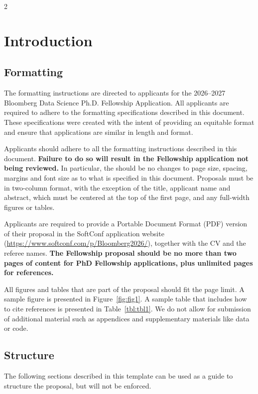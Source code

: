 \documentclass[10pt]{article}
\begin{document}
\begin{multicols*}{2}

\section{Introduction}
 
\subsection{Formatting} 
 
The formatting instructions are directed to applicants for the 2026--2027 Bloomberg Data Science Ph.D. Fellowship Application. All applicants are required to adhere to the formatting specifications described in this document. These specifications were created with the intent of providing an equitable format and ensure that applications are similar in length and format.

Applicants should adhere to all the formatting instructions described in this document. \textbf{Failure to do so will result in the Fellowship application not being reviewed.} In particular, the should be no changes to page size, spacing, margins and font size as to what is specified in this document.
Proposals must be in two-column format, with the exception of the title, applicant name and abstract, which must be centered at the top of the first page, and any full-width figures or tables.

Applicants are required to provide a Portable Document Format (PDF) version of their proposal in the SoftConf application website (\url{https://www.softconf.com/p/Bloomberg2026/}), together with the CV and the referee names. \textbf{The Fellowship proposal should be no more than two pages of content for PhD Fellowship applications, plus unlimited pages for references.}

All figures and tables that are part of the proposal should fit the page limit. A sample figure is presented in Figure~\ref{fig:fig1}. A sample table that includes how to cite references is presented in Table~\ref{tbl:tbl1}. We do not allow for submission of additional material such as appendices and supplementary materials like data or code.

\subsection{Structure} 

The following sections described in this template can be used as a guide to structure the proposal, but will not be enforced.


\end{multicols*}
\end{document}
